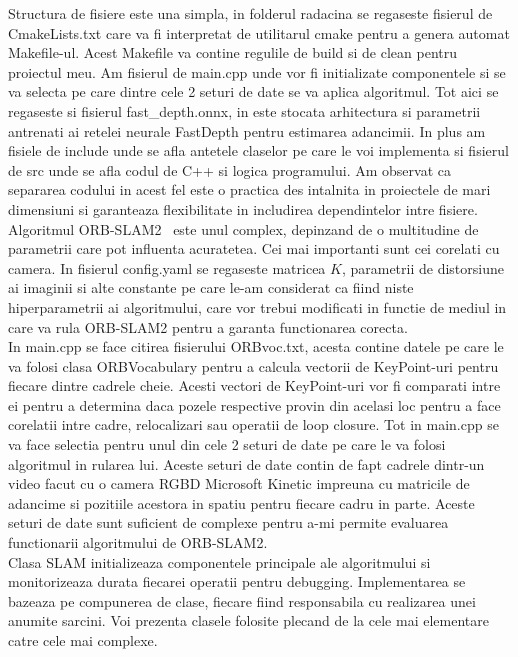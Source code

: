 \documentclass[12pt,a4paper]{report}
\begin{document}
Structura de fisiere este una simpla, in folderul radacina se regaseste fisierul de 
CmakeLists.txt care va fi interpretat de utilitarul cmake pentru a genera automat Makefile-ul. 
Acest Makefile va contine regulile de build si de clean pentru proiectul meu. Am fisierul de 
main.cpp unde vor fi initializate componentele si se va selecta pe care dintre cele 2 seturi
de date se va aplica algoritmul. Tot aici se regaseste si fisierul fast\_depth.onnx, in este 
stocata arhitectura si parametrii antrenati ai retelei neurale FastDepth pentru estimarea 
adancimii. In plus am fisiele de include unde se afla antetele claselor pe care le voi 
implementa si fisierul de src unde se afla codul de C++ si logica programului. Am observat ca 
separarea codului in acest fel este o practica des intalnita in proiectele de mari dimensiuni 
si garanteaza flexibilitate in includirea dependintelor intre fisiere. Algoritmul ORB-SLAM2 \
este unul complex, depinzand de o multitudine de parametrii care pot influenta acuratetea.
Cei mai importanti sunt cei corelati cu camera. In fisierul config.yaml se regaseste matricea \(K\), 
parametrii de distorsiune ai imaginii si alte constante pe care le-am considerat ca fiind niste
hiperparametrii ai algoritmului, care vor trebui modificati in functie de mediul in care va rula
ORB-SLAM2 pentru a garanta functionarea corecta. \\
In main.cpp se face citirea fisierului ORBvoc.txt, acesta contine datele pe care le va folosi
clasa ORBVocabulary pentru a calcula vectorii de KeyPoint-uri pentru fiecare dintre cadrele cheie.
Acesti vectori de KeyPoint-uri vor fi comparati intre ei pentru a determina daca pozele respective 
provin din acelasi loc pentru a face corelatii intre cadre, relocalizari sau operatii de loop
closure. Tot in main.cpp se va face selectia pentru unul din cele 2 seturi de date pe care le va
folosi algoritmul in rularea lui. Aceste seturi de date contin de fapt cadrele dintr-un video 
facut cu o camera RGBD Microsoft Kinetic impreuna cu matricile de adancime si pozitiile acestora
in spatiu pentru fiecare cadru in parte. Aceste seturi de date sunt suficient de complexe pentru 
a-mi permite evaluarea functionarii algoritmului de ORB-SLAM2. \\
Clasa SLAM initializeaza componentele principale ale algoritmului si monitorizeaza durata 
fiecarei operatii pentru debugging. Implementarea se bazeaza pe compunerea de clase, fiecare 
fiind responsabila cu realizarea unei anumite sarcini. Voi prezenta clasele folosite plecand 
de la cele mai elementare catre cele mai complexe. \\       
\end{document}
